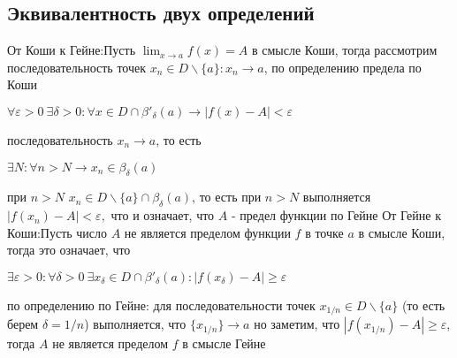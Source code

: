 \documentclass[12pt]{article}
\theoremstyle{definition}
\begin{document}
\subsection{Эквивалентность двух определений}
От Коши к Гейне:\newline Пусть $\lim_{x\to a}f(x) = A$ в смысле Коши, тогда рассмотрим последовательность точек $x_n \in D \backslash \{a\}: x_n \to a$, по определению предела по Коши 
\begin{center}
$\forall \varepsilon > 0 \ \exists \delta > 0: \forall x \in D \cap \beta'_{\delta}(a) \to |f(x) - A | < \varepsilon$
\end{center}
последовательность $x_n \to a$, то есть 
\begin{center}
$\exists N: \forall n > N \to x_n \in \beta_{\delta}(a)$    
\end{center}
при $n > N$ $x_n \in D \backslash \{a\} \cap \beta_{\delta}(a)$, то есть при $n > N$ выполняется $
|f(x_n) - A| < \varepsilon, $ что и означает, что $A$ - предел функции по Гейне\newline
От Гейне к Коши:\newline Пусть число $A$ не является пределом функции $f$ в точке $a$ в смысле Коши, тогда это означает, что
\begin{center}
$\exists \varepsilon > 0: \forall \delta > 0 \ \exists x_{\delta} \in D \cap \beta'_{\delta}(a): |f(x_{\delta}) - A| \geq \varepsilon$
\end{center}
по определению  по Гейне: для последовательности точек $ x_{1/n} \in D \backslash \{a\} $ (то есть берем $\delta = 1/n$) выполняется, что $\{x_{1/n}\} \to a$ но заметим, что $|f(x_{1/n}) - A| \geq \varepsilon $, тогда $A$ не является пределом $f$ в смысле Гейне
\end{document}
